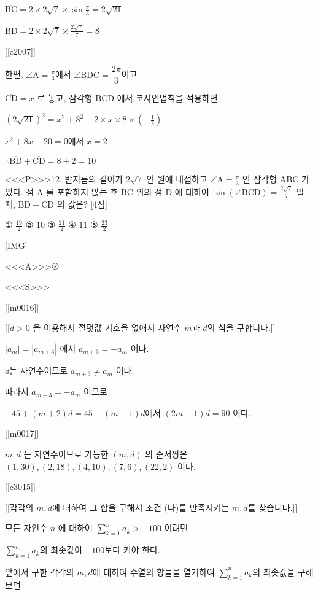 \documentclass{oblivoir}
\begin{document}
$\overline{\mathrm{BC}}=2 \times 2 \sqrt{7} \times \sin \frac{\pi}{3}=2 \sqrt{21}$

$\overline{\mathrm{BD}}=2 \times 2 \sqrt{7} \times \frac{2 \sqrt{7}}{7}=8$

[[c2007]]

한편, $\angle \mathrm{A}=\frac{\pi}{3}$에서 $ \angle \mathrm{BDC} = \dfrac{2\pi}{3}$이고

$\overline{\mathrm{CD}}=x$ 로 놓고, 삼각형 $\mathrm{BCD}$ 에서 코사인법칙을 적용하면

$ \left( 2 \sqrt{21} \right)^{2}=x^{2}+8^{2}-2 \times x \times 8 \times \left( -\frac{1}{2} \right)$

$x^{2}+8x-20=0$에서 $x=2$

$\therefore \overline{\mathrm{BD}}+\overline{\mathrm{CD}}=8+2=10$


<<<P>>>12. 반지름의 길이가 $2 \sqrt{7}$ 인 원에 내접하고 $\angle \mathrm{A}=\frac{\pi}{3}$ 인 삼각형 $\mathrm{ABC}$ 가 있다. 점 $\mathrm{A}$ 를 포함하지 않는 호 $\mathrm{BC}$ 위의 점 $\mathrm{D}$ 에 대하여 $\sin (\angle \mathrm{BCD})=\frac{2 \sqrt{7}}{7}$ 일 때, $\overline{\mathrm{BD}}+\overline{\mathrm{CD}}$ 의 값은? [4점]

① $\frac{19}{2}$
② $10$
③ $\frac{21}{2}$
④ $11$
⑤ $\frac{23}{2}$

[IMG]

<<<A>>>②

<<<S>>>

[[m0016]]

[[$d > 0$ 을 이용해서 절댓값 기호을 없애서 자연수 $m$과 $d$의 식을 구합니다.]] 

$\left|a_{m}\right|=\left|a_{m+3}\right|$ 에서 $a_{m+3}=\pm a_{m}$ 이다.

$d$는 자연수이므로 $a_{m+3} \neq a_{m}$ 이다.

따라서 $a_{m+3}=-a_{m}$ 이므로

$-45+(m+2) d=45-(m-1) d$에서 $(2 m+1) d=90 $ 이다.

[[m0017]]

$m, d$ 는 자연수이므로 가능한 $(m, d)$ 의 순서쌍은 $(1,30),(2,18),(4,10),(7,6),(22,2)$ 이다.

[[c3015]]

[[각각의 $m,d$에 대하여 그 합을 구해서 조건 (나)를 만족시키는 $m,d$를 찾습니다.]]

모든 자연수 $n$ 에 대하여 $\sum_{k=1}^{n} a_{k}>-100$ 이려면 

$\sum_{k=1}^{n} a_{k}$의 최솟값이 $-100$보다 커야 한다.

앞에서 구한 각각의 $m,d$에 대하여 수열의 항들을 열거하여 $\sum_{k=1}^{n} a_{k}$의 최솟값을 구해보면
\end{document}
